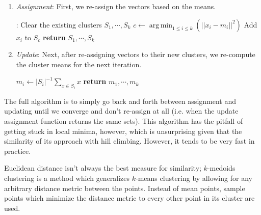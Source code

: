 \documentclass{article}
\DeclareMathOperator*{\argmin}{arg\,min}
\begin{document}
\begin{enumerate}
    \item \textit{Assignment}: First, we re-assign the vectors based on the means.
        \begin{algorithmic}
            :
                \State Clear the existing clusters $ S_1, \cdots, S_k $
                    \State $ c \gets \argmin_{1 \leq i \leq k} (|| x_i - m_i ||^2) $
                    \State Add $ x_i $ to $ S_c $
                \EndFor
                \State \textbf{return} $ S_1, \cdots, S_k $
            \EndProcedure
        \end{algorithmic}
    \item \textit{Update}: Next, after re-assigning vectors to their new clusters, we re-compute the cluster means for the next iteration.
        \begin{algorithmic}
                    \State $ m_i \gets | S_i |^{-1} \sum_{x \in S_i} x $
                \EndFor
                \State \textbf{return} $ m_1, \cdots, m_k $
            \EndProcedure
        \end{algorithmic}
\end{enumerate}
The full algorithm is to simply go back and forth between assignment and updating until we converge and don't re-assign at all (i.e. when the update assignment function returns the same sets). This algorithm has the pitfall of getting stuck in local minima, however, which is unsurprising given that the similarity of its approach with hill climbing. However, it tends to be very fast in practice.

Euclidean distance isn't always the best measure for similarity; $ k $-medoids clustering is a method which generalizes $ k $-means clustering by allowing for any arbitrary distance metric between the points. Instead of mean points, sample points which minimize the distance metric to every other point in its cluster are used.
\end{document}
